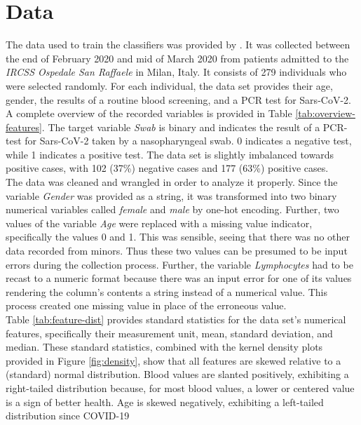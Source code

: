 \section{Data}
The data used to train the classifiers was provided by 
\citeauthor{RN127} \cite{RN127}. 
It was collected between the end of February 2020 and mid of March 2020 from 
patients admitted to the \textit{IRCSS Ospedale San Raffaele} in Milan, 
Italy. It consists of 279 individuals who were selected randomly.
For each individual, the data set provides their age, gender, the results of a 
routine blood screening, and a PCR test for Sars-CoV-2.
A complete overview of the recorded variables is provided in Table 
\ref{tab:overview-features}. The target variable \textit{Swab} is binary and 
indicates the result of a PCR-test for Sars-CoV-2 taken by a nasopharyngeal 
swab. 0 indicates a negative test, while 1 indicates a positive test.
The data set is slightly imbalanced towards positive cases, with 102 (37\%) 
negative cases and 177 (63\%) positive cases.
\\
The data was cleaned and wrangled in order to analyze it properly.
Since the variable \textit{Gender} 
was provided as a string, it was transformed into two binary numerical 
variables called \textit{female} and \textit{male} by one-hot encoding.
Further, two values of the variable \textit{Age} were replaced with a missing 
value indicator, specifically 
the values 0 and 1. This was sensible, seeing that there was no other 
data recorded from minors. Thus these two values can 
be presumed to be input errors during the collection process.
Further, the variable \textit{Lymphocytes} had to be recast to a numeric 
format because there was an input error for one of its 
values rendering the column's contents a string instead of a numerical 
value. This process created one missing value in place of the erroneous value.
\\
Table \ref{tab:feature-dist} provides standard statistics for the data set's 
numerical features, specifically their measurement unit, mean, standard 
deviation, and median.
These standard statistics, combined with the kernel density plots 
provided in Figure \ref{fig:density}, show that all features are skewed 
relative to a (standard) normal distribution. Blood values are 
slanted positively, exhibiting a right-tailed distribution because, for most 
blood values, a lower or centered value is a sign of better health. Age 
is skewed negatively, exhibiting a left-tailed distribution since COVID-19 
